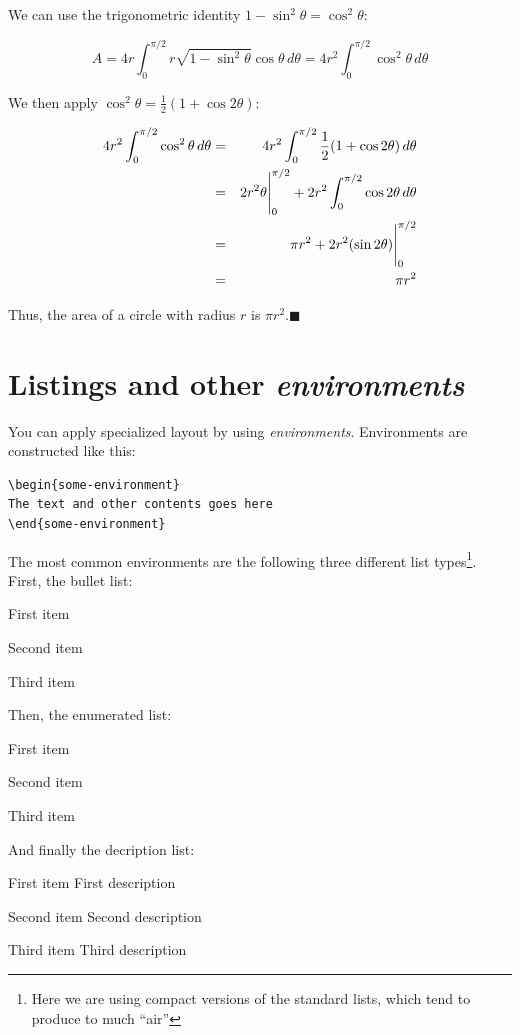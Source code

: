  We can use the trigonometric identity $1 - \sin^2 \theta = \cos^2 \theta$:

$$
A=4r\int_0^{\pi/2} r\sqrt{1-\sin^2 \theta} \cos \theta\, d\theta=
4r^2\int_0^{\pi/2} \cos^2 \theta\, d\theta
$$

We then apply $\cos^2 \theta = \frac{1}{2}(1 + \cos 2\theta)$:

\begin{eqnarray*}
4r^2\int_0^{\pi/2} \cos^2 \theta\, d\theta &=& 4r^2\int_0^{\pi/2}  \frac{1}{2}(1 + \cos 2\theta) \,d\theta\\
& = & {2r^2\theta}\Bigg{|}_0^{\pi/2} + 2r^2\int_0^{\pi/2} \cos 2\theta \,d\theta\\
                                  & = & \pi r^2 + 2r^2(\sin2\theta)\Bigg{|}_0^{\pi/2}\\
                                  & = & \pi r^2
\end{eqnarray*}

Thus, the area of a circle with radius $r$ is $\pi
r^2$.\hfill$\blacksquare$


\section{Listings and other {\em environments}}

You can apply specialized layout by using  {\em environments}. Environments are constructed like this:

\begin{lstlisting}[float=htpb]
\begin{some-environment}
The text and other contents goes here
\end{some-environment}
\end{lstlisting}

The most common environments are the following three different list types\footnote{Here we are using compact versions of the standard lists, which tend to produce to much ``air''}. First, the bullet list:

\begin{compactitem}
\item First item
\item Second item
\item Third item
\end{compactitem}
Then, the enumerated list:
\begin{compactenum}
\item First item
\item Second item
\item Third item
\end{compactenum}
And finally the decription list:
\begin{compactdesc}
\item [First item] First description \lipsum[5]
\item [Second item] Second description
\item [Third item] Third description
\end{compactdesc}

